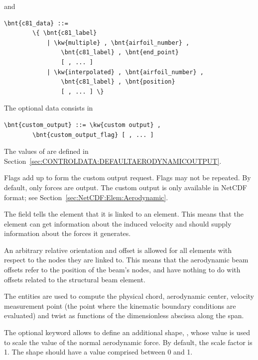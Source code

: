 and
\begin{Verbatim}[commandchars=\\\{\}]
    \bnt{c81_data} ::=
        \{ \bnt{c81_label}
            | \kw{multiple} , \bnt{airfoil_number} ,
                \bnt{c81_label} , \bnt{end_point}
                [ , ... ]
            | \kw{interpolated} , \bnt{airfoil_number} ,
                \bnt{c81_label} , \bnt{position}
                [ , ... ] \}
\end{Verbatim}
The  optional data consists in
\begin{Verbatim}[commandchars=\\\{\}]
    \bnt{custom_output} ::= \kw{custom output} , 
        \bnt{custom_output_flag} [ , ... ]
\end{Verbatim}
The values of 
are defined in Section~\ref{sec:CONTROLDATA:DEFAULTAERODYNAMICOUTPUT}.

Flags add up to form the custom output request.
Flags may not be repeated.
By default, only forces are output.
The custom output is only available in NetCDF format;
see Section~\ref{sec:NetCDF:Elem:Aerodynamic}.

The field  tells the element that it is linked to an
 element.
This means that the element can get information about the
induced velocity and should supply information about the forces it generates.

An arbitrary relative orientation and offset is allowed for all elements with
respect to the nodes they are linked to. 
This means that the aerodynamic beam offsets refer to the position
of the beam's nodes, and have nothing to do with offsets related
to the structural beam element.

The  entities are used to compute the physical chord,
aerodynamic center, velocity measurement point (the point where the
kinematic boundary conditions are evaluated) and twist as functions 
of the dimensionless abscissa along the span.

The optional  keyword allows to define an additional shape,
,
whose value is used to scale the value of the normal aerodynamic force.
By default, the scale factor is 1.
The  shape should have a value comprised between 0 and 1.

